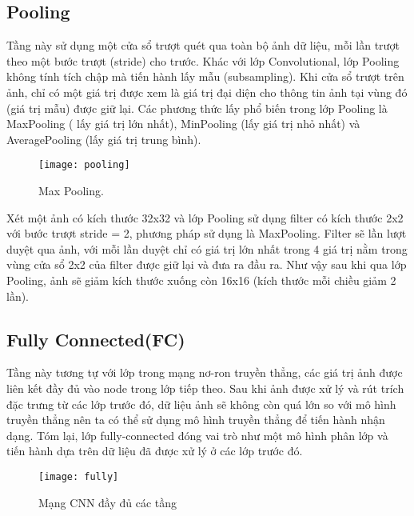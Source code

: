 \documentclass[13pt, a4paper]{extreport}
\begin{document}
\subsection{Pooling}
\indent Tầng này sử dụng một cửa sổ trượt quét qua toàn bộ ảnh dữ liệu, mỗi lần trượt theo một bước trượt (stride) cho trước. Khác với lớp Convolutional, lớp Pooling không tính tích chập mà tiến hành lấy mẫu (subsampling). Khi cửa sổ trượt trên ảnh, chỉ có một giá trị được xem là giá trị đại diện cho thông tin ảnh tại vùng đó (giá trị mẫu) được giữ lại. Các phương thức lấy phổ biến trong lớp Pooling là MaxPooling ( lấy giá trị lớn nhất), MinPooling (lấy giá trị nhỏ nhất) và AveragePooling (lấy giá trị trung bình).
\begin{figure}[H]
  \centering
    \texttt{[image: pooling]}
   \caption{\large Max Pooling.}
\end{figure}

\indent Xét một ảnh có kích thước 32x32 và lớp Pooling sử dụng filter có kích thước 2x2 với bước trượt stride = 2, phương pháp sử dụng là MaxPooling. Filter sẽ lần lượt duyệt qua ảnh, với mỗi lần duyệt chỉ có giá trị lớn nhất trong 4 giá trị nằm trong vùng cửa sổ 2x2 của filter được giữ lại và đưa ra đầu ra. Như vậy sau khi qua lớp Pooling, ảnh sẽ giảm kích thước xuống còn 16x16 (kích thước mỗi chiều giảm 2 lần).

\subsection{Fully Connected(FC)}
\indent Tầng này tương tự với lớp trong mạng nơ-ron truyền thẳng, các giá trị ảnh được liên kết đầy đủ vào node trong lớp tiếp theo. Sau khi ảnh được xử lý và rút trích đặc trưng từ các lớp trước đó, dữ liệu ảnh sẽ không còn quá lớn so với mô hình truyền thẳng nên ta có thể sử dụng mô hình truyền thẳng để tiến hành nhận dạng. Tóm lại, lớp fully-connected đóng vai trò như một mô hình phân lớp và tiến hành dựa trên dữ liệu đã được xử lý ở các lớp trước đó.
\begin{figure}[H]
  \centering
    \texttt{[image: fully]}
   \caption{\large Mạng CNN đầy đủ các tầng}
\end{figure}
\end{document}
